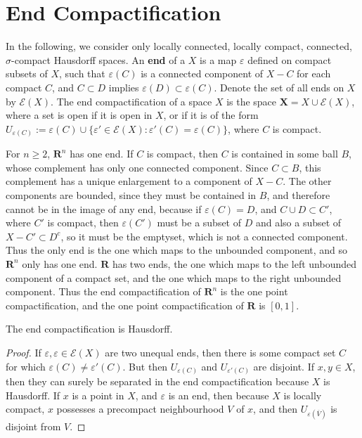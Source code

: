 \section{End Compactification}

In the following, we consider only locally connected, locally compact, connected, $\sigma$-compact Hausdorff spaces. An {\bf end} of a $X$ is a map $\varepsilon$ defined on compact subsets of $X$, such that $\varepsilon(C)$ is a connected component of $X - C$ for each compact $C$, and $C \subset D$ implies $\varepsilon(D) \subset \varepsilon(C)$. Denote the set of all ends on $X$ by $\mathcal{E}(X)$. The end compactification of a space $X$ is the space $\mathbf{X} = X \cup \mathcal{E}(X)$, where a set is open if it is open in $X$, or if it is of the form $U_{\varepsilon(C)} := \varepsilon(C) \cup \{ \varepsilon' \in \mathcal{E}(X) : \varepsilon'(C) = \varepsilon(C) \}$, where $C$ is compact.

\begin{example}
    For $n \geq 2$, $\mathbf{R}^n$ has one end. If $C$ is compact, then $C$ is contained in some ball $B$, whose complement has only one connected component. Since $C \subset B$, this complement has a unique enlargement to a component of $X - C$. The other components are bounded, since they must be contained in $B$, and therefore cannot be in the image of any end, because if $\varepsilon(C) = D$, and $C \cup D \subset C'$, where $C'$ is compact, then $\varepsilon(C')$ must be a subset of $D$ and also a subset of $X - C' \subset D^c$, so it must be the emptyset, which is not a connected component. Thus the only end is the one which maps to the unbounded component, and so $\mathbf{R}^n$ only has one end. $\mathbf{R}$ has two ends, the one which maps to the left unbounded component of a compact set, and the one which maps to the right unbounded component. Thus the end compactification of $\mathbf{R}^n$ is the one point compactification, and the one point compactification of $\mathbf{R}$ is $[0,1]$.
\end{example}

\begin{lemma}
    The end compactification is Hausdorff.
\end{lemma}
\begin{proof}
    If $\varepsilon, \varepsilon \in \mathcal{E}(X)$ are two unequal ends, then there is some compact set $C$ for which $\varepsilon(C) \neq \varepsilon'(C)$. But then $U_{\varepsilon(C)}$ and $U_{\varepsilon'(C)}$ are disjoint. If $x, y \in X$, then they can surely be separated in the end compactification because $X$ is Hausdorff. If $x$ is a point in $X$, and $\varepsilon$ is an end, then because $X$ is locally compact, $x$ possesses a precompact neighbourhood $V$ of $x$, and then $U_{\varepsilon(\overline{V})}$ is disjoint from $V$.
\end{proof}

